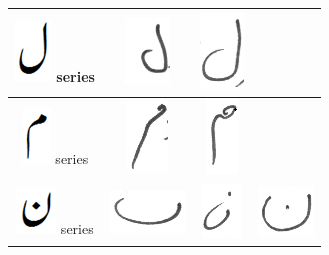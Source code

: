 \begin{table}[h]
\begin{tabular}{@{}cccc@{}}
\includegraphics[scale=0.15]{Laam_orig} series & \includegraphics[scale=0.15]{laaam} & \includegraphics[scale=0.15]{laam2}  &  \\
\hline
\includegraphics[scale=0.15]{meem_orig} series & \includegraphics[scale=0.15]{meem} & \includegraphics[scale=0.15]{meem2}  &  \\
\hline
\includegraphics[scale=0.15]{noon_orig} series & \includegraphics[scale=0.15]{noon_guna} & \includegraphics[scale=0.15]{noon} & 
\includegraphics[scale=0.15]{noon2} \\

\end{tabular}
\end{table}
